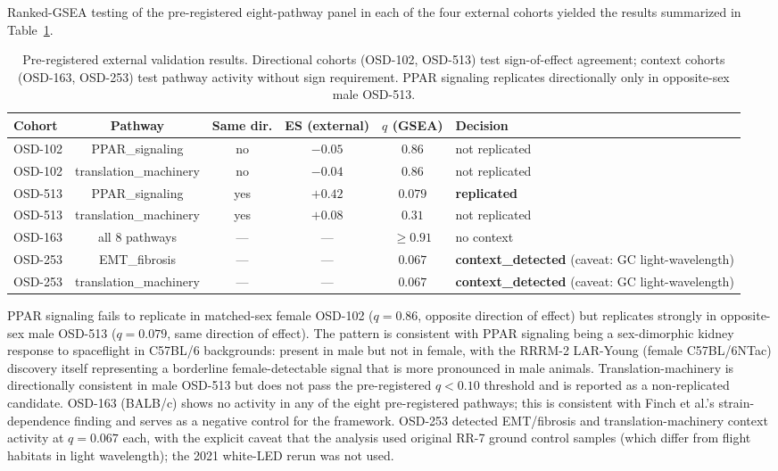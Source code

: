 \documentclass[11pt]{article}
\begin{document}
Ranked-GSEA testing of the pre-registered eight-pathway panel in each of the four external cohorts yielded the results summarized in Table~\ref{tab:replication}.

\begin{table}[h]
\centering\small
\begin{tabular}{lccccp{3.6cm}}
\toprule
Cohort & Pathway & Same dir. & ES (external) & $q$ (GSEA) & Decision \\
\midrule
OSD-102 & PPAR\_signaling & no  & $-0.05$ & $0.86$ & not replicated \\
OSD-102 & translation\_machinery & no  & $-0.04$ & $0.86$ & not replicated \\
OSD-513 & PPAR\_signaling & yes & $+0.42$ & $\mathbf{0.079}$ & \textbf{replicated} \\
OSD-513 & translation\_machinery & yes & $+0.08$ & $0.31$ & not replicated \\
OSD-163 & all 8 pathways & --- & --- & $\geq 0.91$ & no context \\
OSD-253 & EMT\_fibrosis & --- & --- & $\mathbf{0.067}$ & \textbf{context\_detected} (caveat: GC light-wavelength) \\
OSD-253 & translation\_machinery & --- & --- & $\mathbf{0.067}$ & \textbf{context\_detected} (caveat: GC light-wavelength) \\
\bottomrule
\end{tabular}
\caption{Pre-registered external validation results. Directional cohorts (OSD-102, OSD-513) test sign-of-effect agreement; context cohorts (OSD-163, OSD-253) test pathway activity without sign requirement. PPAR signaling replicates directionally only in opposite-sex male OSD-513.}
\label{tab:replication}
\end{table}

PPAR signaling fails to replicate in matched-sex female OSD-102 ($q = 0.86$, opposite direction of effect) but replicates strongly in opposite-sex male OSD-513 ($q = 0.079$, same direction of effect). The pattern is consistent with PPAR signaling being a sex-dimorphic kidney response to spaceflight in C57BL/6 backgrounds: present in male but not in female, with the RRRM-2 LAR-Young (female C57BL/6NTac) discovery itself representing a borderline female-detectable signal that is more pronounced in male animals. Translation-machinery is directionally consistent in male OSD-513 but does not pass the pre-registered $q < 0.10$ threshold and is reported as a non-replicated candidate. OSD-163 (BALB/c) shows no activity in any of the eight pre-registered pathways; this is consistent with Finch et al.'s strain-dependence finding and serves as a negative control for the framework. OSD-253 detected EMT/fibrosis and translation-machinery context activity at $q = 0.067$ each, with the explicit caveat that the analysis used original RR-7 ground control samples (which differ from flight habitats in light wavelength); the 2021 white-LED rerun was not used.
\end{document}
